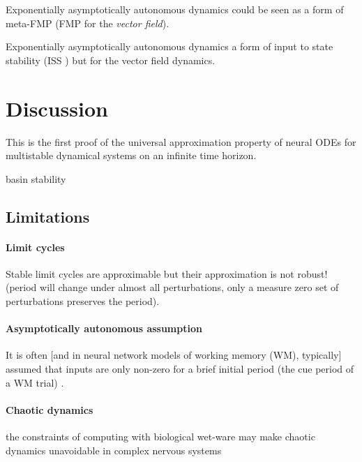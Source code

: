 \documentclass{article}
\newcounter{ct}
\begin{document}
\begin{remark}
Exponentially asymptotically autonomous dynamics could be seen as a form of meta-FMP (FMP for the \emph{vector field}).
\end{remark}

\begin{remark}
Exponentially asymptotically autonomous dynamics a form of input to state stability (ISS \citep{sontag1995iss, sontag1996iss, sontag2008iss}) but for the vector field dynamics.
\end{remark}



\section{Discussion}
This is the first proof of the universal approximation property of neural ODEs for multistable dynamical systems on an infinite time horizon.


basin stability \citep{menck2013basinstability}

\subsection{Limitations}
\paragraph{Limit cycles}
Stable limit cycles are approximable but their approximation is not robust! (period will change under almost all perturbations, only a measure zero set of perturbations preserves the period).


\paragraph{Asymptotically autonomous assumption}
It is often [and in neural network models of working memory (WM), typically] assumed that inputs are only non-zero for a brief initial period (the cue period of a WM trial)  \citep{hopfield1982neural, stroud2023infromationloading, stroud2024computational, schimel2024preparation}.

\paragraph{Chaotic dynamics}
the constraints of computing with biological wet-ware may make chaotic dynamics unavoidable in complex nervous systems \citep{hirsch1995computing}
 \citep{hoppensteadt2013analysis}
\end{document}

